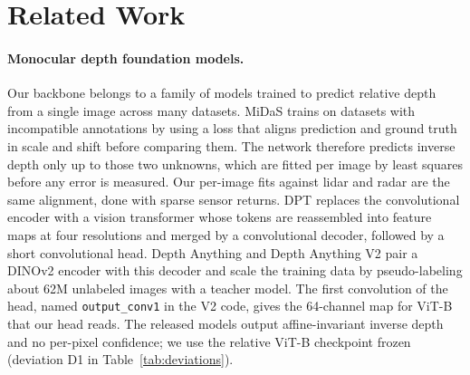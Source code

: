 %
%
\section{Related Work}
\label{sec:related}


\paragraph{Monocular depth foundation models.}
Our backbone belongs to a family of models trained to predict relative depth from a single image across many datasets. MiDaS \citep{ranftl2020midas} trains on datasets with incompatible annotations by using a loss that aligns prediction and ground truth in scale and shift before comparing them. The network therefore predicts inverse depth only up to those two unknowns, which are fitted per image by least squares before any error is measured. Our per-image fits against lidar and radar are the same alignment, done with sparse sensor returns. DPT \citep{ranftl2021dpt} replaces the convolutional encoder with a vision transformer whose tokens are reassembled into feature maps at four resolutions and merged by a convolutional decoder, followed by a short convolutional head. Depth Anything \citep{yang2024depthanything} and Depth Anything V2 \citep{yang2024depthanythingv2} pair a DINOv2 encoder with this decoder and scale the training data by pseudo-labeling about 62M unlabeled images with a teacher model. The first convolution of the head, named \texttt{output\_conv1} in the V2 code, gives the 64-channel map for ViT-B that our head reads. The released models output affine-invariant inverse depth and no per-pixel confidence; we use the relative ViT-B checkpoint frozen (deviation D1 in Table~\ref{tab:deviations}).

